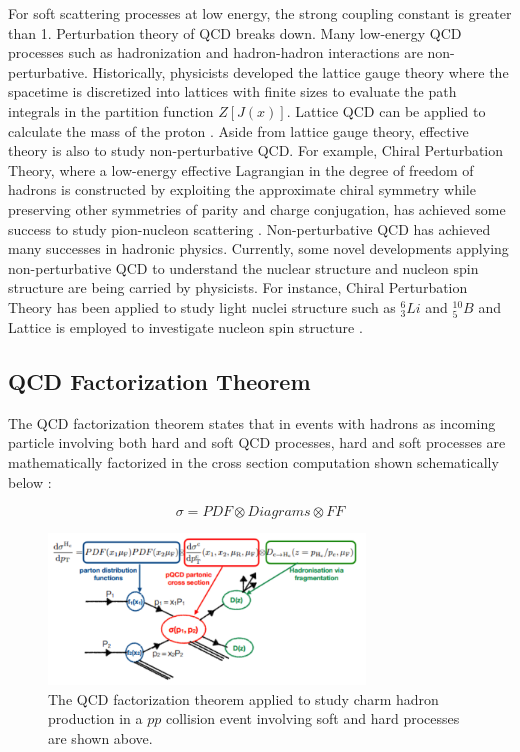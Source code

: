 For soft scattering processes at low energy, the strong coupling constant is greater than 1. Perturbation theory of QCD breaks down. Many low-energy QCD processes such as hadronization and hadron-hadron interactions are non-perturbative. Historically, physicists developed the lattice gauge theory where the spacetime is discretized into lattices with finite sizes to evaluate the path integrals in the partition function $Z[J(x)]$. Lattice QCD can be applied to calculate the mass of the proton \cite{LQCDProtonMass}. Aside from lattice gauge theory, effective theory is also to study non-perturbative QCD. For example, Chiral Perturbation Theory, where a low-energy effective Lagrangian in the degree of freedom of hadrons is constructed by exploiting the approximate chiral symmetry while preserving other symmetries of parity and charge conjugation, has achieved some success to study pion-nucleon scattering \cite{ChiPT}. Non-perturbative QCD has achieved many successes in hadronic physics. Currently, some novel developments applying non-perturbative QCD to understand the nuclear structure and nucleon spin structure are being carried by physicists. For instance, Chiral Perturbation Theory has been applied to study light nuclei structure such as ${}_{3}^{6}Li$ and ${}_{5}^{10}B$ \cite{ChiPTNuclear} and Lattice is employed to investigate nucleon spin structure \cite{LatticeNuclSpin}. 

\subsection{QCD Factorization Theorem}

The QCD factorization theorem states that in events with hadrons as incoming particle involving both hard and soft QCD processes, hard and soft processes are mathematically factorized in the cross section computation shown schematically below \cite{QCDFactorization}: 

\begin{equation}
\sigma = PDF \otimes Diagrams \otimes FF
\end{equation}

\begin{figure}[hbtp]
\begin{center}
\includegraphics[width=0.75\textwidth]{Figures/Chapter1/QCDFacNew.png}
\caption{The QCD factorization theorem applied to study charm hadron production in a $pp$ collision event involving soft and hard processes are shown above.}
\label{QCDFacTheo}
\end{center}
\end{figure} 

